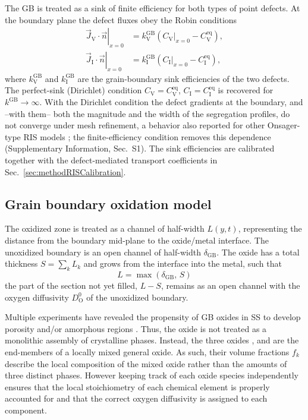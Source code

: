\documentclass[3p,times]{elsarticle} %
\newcommand{\Vac}{\mathrm{V}}          %
\newcommand{\Int}{\mathrm{I}}          %
\newcommand{\GB}{\mathrm{GB}}
\newcommand{\Ox}{\mathrm{O}}           %
\begin{document}
The GB is treated as a sink of finite efficiency for both types of point defects. At
the boundary plane the defect fluxes obey the Robin conditions
\begin{align}
\left.\vec{J}_{\Vac}\!\cdot\!\vec{n}\right|_{x=0}
 &= k_{\Vac}^{\GB}\left(\left.C_{\Vac}\right|_{x=0}-C_{\Vac}^{\mathrm{eq}}\right),
\label{eq:sink-vac}\\
\left.\vec{J}_{\Int}\!\cdot\!\vec{n}\right|_{x=0}
 &= k_{\Int}^{\GB}\left(\left.C_{\Int}\right|_{x=0}-C_{\Int}^{\mathrm{eq}}\right),
\label{eq:sink-int}
\end{align}
where \(k_{\Vac}^{\GB}\) and \(k_{\Int}^{\GB}\) are the grain-boundary sink
efficiencies of the two defects. The perfect-sink
(Dirichlet) condition \(C_{\Vac}=C_{\Vac}^{\mathrm{eq}}\),
\(C_{\Int}=C_{\Int}^{\mathrm{eq}}\) is recovered for \(k^{\GB}\to\infty\). With the
Dirichlet condition the defect gradients at the boundary, and --with them-- both the
magnitude and the width of the segregation profiles, do not converge under mesh
refinement, a behavior also reported for other Onsager-type RIS models
\cite{oplinger2026radiationinduceda}; the finite-efficiency condition removes
this dependence (Supplementary Information, Sec.~S1). The sink efficiencies
are calibrated together with the defect-mediated transport coefficients in
Sec.~\ref{sec:methodRISCalibration}.

\subsection{Grain boundary oxidation model}
\label{sec:methodGBOxidation}

The oxidized zone is treated as a channel of half-width \(L(y,t)\), representing the
distance from the boundary mid-plane to the oxide/metal interface. The
unoxidized boundary is an open channel of half-width \(\delta_{\GB}\). The oxide has a total thickness \(S=\sum_k L_k\) and grows from the interface into the
metal, such that
\begin{equation}
L=\max\left(\delta_{\GB},\,S\right)
\label{eq:halfwidth}
\end{equation}
the part of the section not yet filled, \(L-S\), remains as an open channel with the
oxygen diffusivity \(D_{\Ox}^{0}\) of the unoxidized boundary.


Multiple experiments have revealed the propensity of GB oxides in SS to develop porosity and/or amorphous regions \cite{deng2017effect,kuang2022highresolution}.
Thus, the oxide is not treated as a monolithic assembly of crystalline phases. Instead, the three oxides ,  and
 are the end-members of a locally mixed general oxide. As such, their volume fractions \(f_k\) describe the
local composition of the mixed oxide rather than the amounts of three distinct
phases.
However keeping track of each oxide species independently ensures that the local stoichiometry of each chemical element is properly accounted for and that the correct oxygen diffusivity is assigned to each component. 
\end{document}
